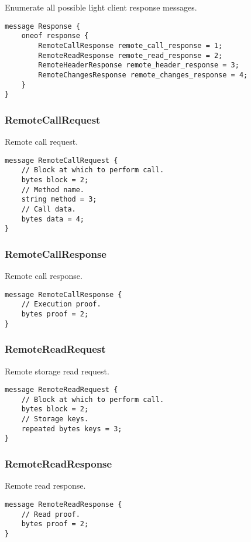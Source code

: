 \documentclass{book}
\begin{document}
Enumerate all possible light client response messages.

\begin{lstlisting}[frame=single]
message Response {
	oneof response {
		RemoteCallResponse remote_call_response = 1;
		RemoteReadResponse remote_read_response = 2;
		RemoteHeaderResponse remote_header_response = 3;
		RemoteChangesResponse remote_changes_response = 4;
	}
}
\end{lstlisting}

\subsubsection{RemoteCallRequest}

Remote call request.

\begin{lstlisting}[frame=single]
message RemoteCallRequest {
	// Block at which to perform call.
	bytes block = 2;
	// Method name.
	string method = 3;
	// Call data.
	bytes data = 4;
}
\end{lstlisting}

\subsubsection{RemoteCallResponse}

Remote call response.

\begin{lstlisting}[frame=single]
message RemoteCallResponse {
	// Execution proof.
	bytes proof = 2;
}
\end{lstlisting}

\subsubsection{RemoteReadRequest}

Remote storage read request.

\begin{lstlisting}[frame=single]
message RemoteReadRequest {
	// Block at which to perform call.
	bytes block = 2;
	// Storage keys.
	repeated bytes keys = 3;
}
\end{lstlisting}

\subsubsection{RemoteReadResponse}

Remote read response.

\begin{lstlisting}[frame=single]
message RemoteReadResponse {
	// Read proof.
	bytes proof = 2;
}
\end{lstlisting}
\end{document}
